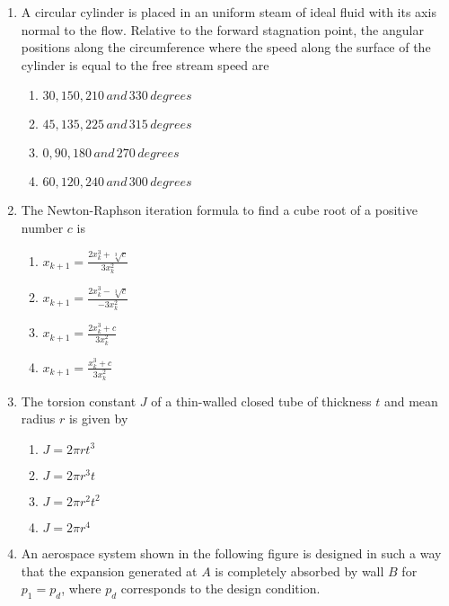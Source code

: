 \documentclass[journal]{IEEEtran}
\begin{document}
\begin{enumerate}
    \item A circular cylinder is placed in an uniform steam of ideal fluid with its axis normal to the flow. Relative to the forward stagnation point, the angular positions along the circumference where the speed along the surface of the cylinder is equal to the free stream speed are 
    \begin{enumerate}
        \item $30,150,210\,and\,330\,degrees$
        \item $45,135,225\,and\,315\,degrees$
        \item $0,90,180\,and\,270\,degrees$
        \item $60,120,240\,and\,300\,degrees$
    \end{enumerate}
    \item The Newton-Raphson iteration formula to find a cube root of a positive number $c$ is
    \begin{enumerate}
        \item $x_{k+1}=\frac{2x_k^3+\sqrt[3]{c}}{3x_k^2}$
        \item $x_{k+1}=\frac{2x_k^3-\sqrt[3]{c}}{-3x_k^2}$
        \item $x_{k+1}=\frac{2x_k^3+c}{3x_k^2}$
        \item $x_{k+1}=\frac{x_k^3+c}{3x_k^2}$
    \end{enumerate}
    \item The torsion constant $J$ of a thin-walled closed tube of thickness $t$ and mean radius $r$ is given by
    \begin{enumerate}
        \item $J=2\pi rt^3$
        \item $J=2\pi r^3t$
        \item $J=2\pi r^2t^2$
        \item $J=2\pi r^4$
    \end{enumerate}
    \item An aerospace system shown in the following figure is designed in such a way that the expansion generated at $A$ is completely absorbed by  wall $B$ for $p_1=p_d$, where $p_d$ corresponds to the design condition.

\end{enumerate}
\end{document}

